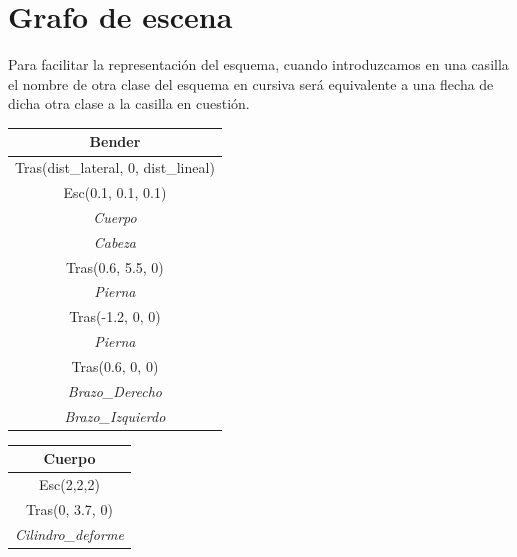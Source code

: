 \documentclass{article}
\begin{document}





\section{Grafo de escena}

Para facilitar la representación del esquema, cuando introduzcamos en una casilla el nombre de otra clase del esquema en cursiva será equivalente a una flecha de dicha otra clase a la casilla en cuestión.

\begin{table}[h]
	\centering
	\label{1}
	\begin{tabular}{|c|}
		\hline
		\textbf{Bender}\\ \hline
		Tras(dist\_lateral, 0, dist\_lineal)\\ \hline
		Esc(0.1, 0.1, 0.1)\\ \hline
		\textit{Cuerpo}\\ \hline
		\textit{Cabeza}\\ \hline
		Tras(0.6, 5.5, 0)\\ \hline
		\textit{Pierna}\\ \hline
		Tras(-1.2, 0, 0)\\ \hline
		\textit{Pierna}\\ \hline
		Tras(0.6, 0, 0)\\ \hline
		\textit{Brazo\_Derecho}\\ \hline
		\textit{Brazo\_Izquierdo}\\ \hline

	\end{tabular}
\end{table}

\begin{table}[h]
	\centering
	\label{2}
	\begin{tabular}{|c|}
		\hline
		\textbf{Cuerpo}\\ \hline
		Esc(2,2,2)\\ \hline
		Tras(0, 3.7, 0)\\ \hline
		\textit{Cilindro\_deforme}\\ \hline

	\end{tabular}
\end{table}
\end{document}
